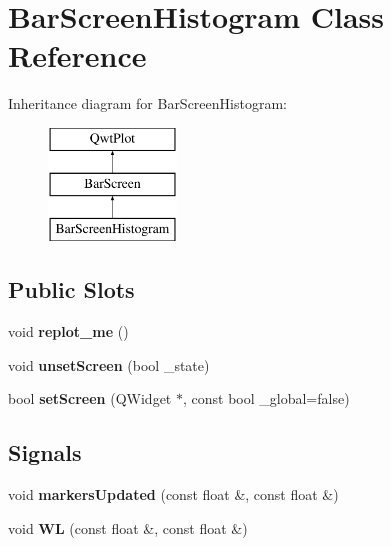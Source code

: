 \hypertarget{classBarScreenHistogram}{}\section{Bar\+Screen\+Histogram Class Reference}
\label{classBarScreenHistogram}
Inheritance diagram for Bar\+Screen\+Histogram\+:\begin{figure}[H]
\begin{center}
\leavevmode
\includegraphics[height=3.000000cm]{classBarScreenHistogram}
\end{center}
\end{figure}
\subsection*{Public Slots}
\begin{DoxyCompactItemize}
\item 
\mbox{\label{classBarScreenHistogram_a8a9a46d20f80b4ff1a8225f164651ce4}} 
void {\bfseries replot\+\_\+me} ()
\item 
\mbox{\label{classBarScreen_a73d64473bee2dceb5e14f6ecd9085c5a}} 
void {\bfseries unset\+Screen} (bool \+\_\+state)
\item 
\mbox{\label{classBarScreen_a584ecbf24a178b74fee22eb40e6281de}} 
bool {\bfseries set\+Screen} (Q\+Widget $\ast$, const bool \+\_\+global=false)
\end{DoxyCompactItemize}
\subsection*{Signals}
\begin{DoxyCompactItemize}
\item 
\mbox{\label{classBarScreen_a39dadd115d8012630aac2ff7cb188fa6}} 
void {\bfseries markers\+Updated} (const float \&, const float \&)
\item 
\mbox{\label{classBarScreen_a3251fb8903f71f8ea0df00d17b7302cf}} 
void {\bfseries WL} (const float \&, const float \&)
\end{DoxyCompactItemize}
